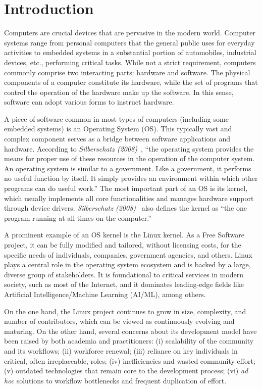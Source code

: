\documentclass[sigconf]{acmart} %
\begin{document}
\section{Introduction}

Computers are crucial devices that are pervasive in the modern world. Computer
systems range from personal computers that the general public uses for everyday
activities to embedded systems in a substantial portion of automobiles,
industrial devices, etc., performing critical tasks. While not a strict
requirement, computers commonly comprise two interacting parts: hardware and
software. The physical components of a computer constitute its hardware, while
the set of programs that control the operation of the hardware make up the
software. In this sense, software can adopt various forms to instruct hardware.

A piece of software common in most types of computers (including some embedded
systems) is an Operating System (OS). This typically vast and complex component
serves as a bridge between software applications and hardware. According to
\textit{Silberschatz (2008)}~\cite{silberschatz2008-operatingsystemconcepts},
``the operating system provides the means for proper use of these resources in
the operation of the computer system. An operating system is similar to a
government. Like a government, it performs no useful function by itself. It
simply provides an environment within which other programs can do useful work.''
The most important part of an OS is its kernel, which usually implements all
core functionalities and manages hardware support through device drivers.
\textit{Silberschatz (2008)}~\cite{silberschatz2008-operatingsystemconcepts}
also defines the kernel as ``the one program running at all times on the
computer.''

A prominent example of an OS kernel is the Linux kernel. As a Free Software
project, it can be fully modified and tailored, without licensing costs, for the
specific needs of individuals, companies, government agencies, and others. Linux
plays a central role in the operating system ecosystem and is backed by a large,
diverse group of stakeholders. It is foundational to critical services in modern
society, such as most of the Internet, and it dominates leading-edge fields like
Artificial Intelligence/Machine Learning (AI/ML), among others.

On the one hand, the Linux project continues to grow in size, complexity, and
number of contributors, which can be viewed as continuously evolving and
maturing. On the other hand, several concerns about its development model have
been raised by both academia and practitioners: (i) scalability of the community
and its workflows; (ii) workforce renewal; (iii) reliance on key individuals in
critical, often irreplaceable, roles; (iv) inefficiencies and wasted community
effort; (v) outdated technologies that remain core to the development process;
(vi) \textit{ad hoc} solutions to workflow bottlenecks and frequent duplication
of effort.
\end{document}
